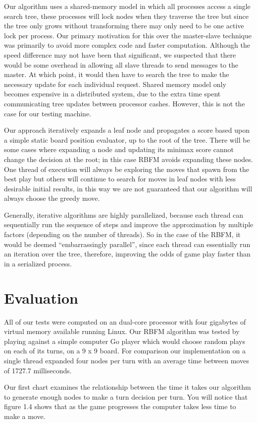 \documentclass[conference]{IEEEtran}
\begin{document}
Our algorithm uses a shared-memory model in which all processes access a single search tree, these processes will lock nodes when they traverse the tree but since the tree only grows without transforming there may only need to be one active lock per process. Our primary motivation for this over the master-slave technique was primarily to avoid more complex code and faster computation. Although the speed difference may not have been that significant, we suspected that there would be some overhead in allowing all slave threads to send messages to the master. At which point, it would then have to search the tree to make the necessary update for each individual request. Shared memory model only becomes expensive in a distributed system, due to the extra time spent communicating tree updates between processor cashes. However, this is not the case for our testing machine.\par
Our approach iteratively expands a leaf node and propagates a score based upon a simple static board position evaluator, up to the root of the tree. There will be some cases where expanding a node and updating its minimax score cannot change the decision at the root; in this case RBFM avoids expanding these nodes. One thread of execution will always be exploring the moves that spawn from the best play but others will continue to search for moves in leaf nodes with less desirable initial results, in this way we are not guaranteed that our algorithm will always choose the greedy move.\par
Generally, iterative algorithms are highly parallelized, because each thread can sequentially run the sequence of steps and improve the approximation by multiple factors (depending on the number of threads). So in the case of the RBFM, it would be deemed “embarrassingly parallel”, since each thread can essentially run an iteration over the tree, therefore, improving the odds of game play faster than in a serialized process.

\section{Evaluation}
All of our tests were computed on an dual-core processor with four gigabytes of virtual memory available running Linux. Our RBFM algorithm was tested by playing against a simple computer Go player which would choose random plays on each of its turns, on a 9 x 9 board. For comparison our implementation on a single thread expanded four nodes per turn with an average time between moves of 1727.7 milliseconds.\par
Our first chart examines the relationship between the time it takes our algorithm to generate enough nodes to make a turn decision per turn. You will notice that figure 1.4 shows that as the game progresses the computer takes less time to make a move.
\end{document}
